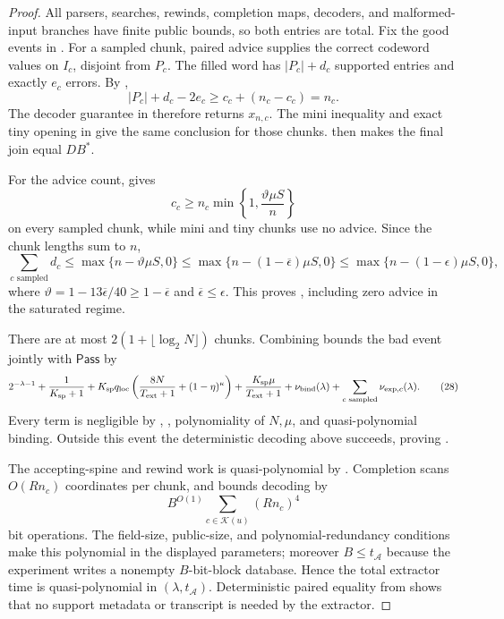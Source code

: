 \documentclass[11pt]{article}
\begin{document}
\begin{proof}
All parsers, searches, rewinds, completion maps, decoders, and malformed-input
branches have finite public bounds, so both entries are total.  Fix the good
events in .  For a sampled chunk, paired advice
supplies the correct codeword values on $I_c$, disjoint from $P_c$.  The filled
word has $|P_c|+d_c$ supported entries and exactly $e_c$ errors.  By
,
\[
 |P_c|+d_c-2e_c\ge c_c+(n_c-c_c)=n_c.
\]
The decoder guarantee in  therefore returns $x_{n,c}$.
The mini inequality and exact tiny opening in 
give the same conclusion for those chunks.   then makes
the final join equal $\mathit{DB}^{*}$.

For the advice count,  gives
\[
 c_c\ge n_c\min\left\{1,\frac{\vartheta\mu S}{n}\right\}
\]
on every sampled chunk, while mini and tiny chunks use no advice.  Since the
chunk lengths sum to $n$,
\[
 \sum_{c\text{ sampled}}d_c
 \le\max\{n-\vartheta\mu S,0\}
 \le\max\{n-(1-\overline\epsilon)\mu S,0\}
 \le\max\{n-(1-\epsilon)\mu S,0\},
\]
where $\vartheta=1-13\overline\epsilon/40\ge1-\overline\epsilon$ and
$\overline\epsilon\le\epsilon$.  This proves , including
zero advice in the saturated regime.

There are at most $2(1+\lfloor\log_2N\rfloor)$ chunks.  Combining
bounds the bad event jointly
with $\mathsf{Pass}$ by
\[
 2^{-\lambda-1}+\frac1{K_{\rm sp}+1}
 +K_{\rm sp}q_{\rm loc}
   \left(\frac{8N}{T_{\rm ext}+1}+(1-\eta)^\kappa\right)
 +\frac{K_{\rm sp}\mu}{T_{\rm ext}+1}
 +\nu_{\rm bind}(\lambda)
 +\sum_{c\text{ sampled}}\nu_{{\rm exp},c}(\lambda).
\tag{28}\label{eq:total-failure}
\]
Every term is negligible by ,
, polynomiality of $N,\mu$, and
quasi-polynomial binding.  Outside this event the deterministic decoding above
succeeds, proving .

The accepting-spine and rewind work is quasi-polynomial by .
Completion scans $O(Rn_c)$ coordinates per chunk, and
 bounds decoding by
\[
 B^{O(1)}\sum_{c\in\mathcal K(u)}(Rn_c)^4
\]
bit operations.  The field-size, public-size, and polynomial-redundancy
conditions make this polynomial in the displayed parameters; moreover
$B\le t_{\mathcal A}$ because the experiment writes a nonempty $B$-bit-block
database.  Hence the total extractor time is quasi-polynomial in
$(\lambda,t_{\mathcal A})$.  Deterministic paired equality from
 shows that no support metadata or
transcript is needed by the extractor.
\end{proof}
\end{document}

